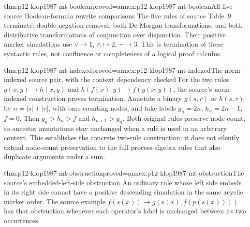 \begin{hbtheorem}{thm:p12-klop1987-mt-boolean}{proved=annex:p12-klop1987-mt-boolean}{All five source Boolean-formula rewrite comparisons}
The five rules of source Table~9 terminate: double-negation removal,
both De Morgan transformations, and both distributive transformations
of conjunction over disjunction. Their positive marker simulations
use \(\lor\mapsto1\), \(\land\mapsto2\), \(\neg\mapsto3\).
This is termination of these syntactic rules, not confluence or
completeness of a logical proof calculus.
\end{hbtheorem}

\begin{hbtheorem}{thm:p12-klop1987-mt-indexed}{proved=annex:p12-klop1987-mt-indexed}{The norm-indexed source pair, with the context dependency checked}
For the two rules \(g(x,y)\to h(x,y)\) and
\(h(f(x),y)\to f(g(x,y))\), the source's norm-indexed construction
proves termination. Annotate a binary \(g(s,r)\) or \(h(s,r)\)
by \(n=|s|+|r|\), with bars counting nodes, and take labels
\(g_n=2n\), \(h_n=2n-1\), \(f=0\).
Then \(g_n>h_n>f\) and \(h_{n+1}>g_n\).
Both original rules preserve node count, so ancestor annotations
stay unchanged when a rule is used in an arbitrary context.
This establishes the concrete two-rule construction; it does not
silently extend node-count preservation to the full process-algebra
rules that also duplicate arguments under a sum.
\end{hbtheorem}

\begin{hbcorollary}{thm:p12-klop1987-mt-obstruction}{proved=annex:p12-klop1987-mt-obstruction}{The source's embedded-left-side obstruction}
An ordinary rule whose left side embeds in its right side cannot have
a positive descending simulation in the same acyclic marker order.
The source example \(f(s(x))\to g(s(x),f(p(s(x))))\) has that
obstruction whenever each operator's label is unchanged between its
two occurrences.
\end{hbcorollary}

